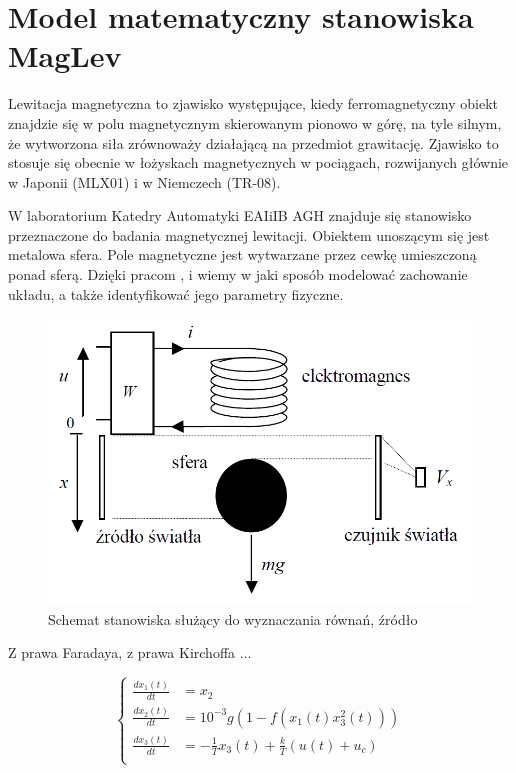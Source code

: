 \section{Model matematyczny stanowiska MagLev}

Lewitacja magnetyczna to zjawisko występujące, kiedy ferromagnetyczny obiekt znajdzie się w polu magnetycznym skierowanym pionowo w górę, na tyle silnym, że wytworzona siła zrównoważy działającą na przedmiot grawitację. Zjawisko to stosuje się obecnie w łożyskach magnetycznych w pociągach, rozwijanych głównie w Japonii (MLX01) i w Niemczech (TR-08).

W laboratorium Katedry Automatyki EAIiIB AGH znajduje się stanowisko przeznaczone do badania magnetycznej lewitacji. Obiektem unoszącym się jest metalowa sfera. Pole magnetyczne jest wytwarzane przez cewkę umieszczoną ponad sferą. Dzięki pracom \cite{Bania1999}, \cite{Bania200.} i \cite{Pilat} wiemy w jaki sposób modelować zachowanie układu, a także identyfikować jego parametry fizyczne.

\begin{figure}[!htb]
\centering
\includegraphics[scale=0.45]{img/model-rownania.PNG}
\caption{Schemat stanowiska służący do wyznaczania równań, źródło \cite{Bania200.}}
\label{rys:model-rownania}
\end{figure}

Z prawa Faradaya, z prawa Kirchoffa ...

\begin{equation}
  \begin{cases}
    \frac{dx_1(t)}{dt} & = x_2 \\
    \frac{dx_2(t)}{dt} & = 10^{-3} g(1-f(x_1(t) x_3^2(t)))  \\
    \frac{dx_3(t)}{dt} & = -\frac{1}{T} x_3(t) + \frac{k}{T} (u(t) + u_c) \\
  \end{cases}  
\end{equation}



